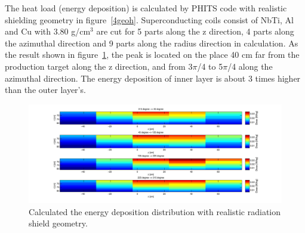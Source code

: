 The heat load (energy deposition) is calculated by PHITS code with realistic shielding geometry in figure~\ref{4geoh}.
Superconducting coils consist of NbTi, Al and Cu with 3.80 g/cm$^3$ are cut for 5 parts along the z direction, 4 parts along the azimuthal direction and 9 parts along the radius direction in calculation.
As the result shown in figure~\ref{4heat}, the peak is located on the place 40 cm far from the production target along the z direction, and from 3$\pi$/4 to 5$\pi$/4 along the azimuthal direction.
The energy deposition of inner layer is about 3 times higher than the outer layer's.
 \begin{figure}[H]
  \centering
  \includegraphics[scale=0.62]{chapter5/fig/HRS.pdf}
  \caption{ Calculated the energy deposition distribution with realistic radiation shield geometry.}
  \label{4heat}
 \end{figure}

